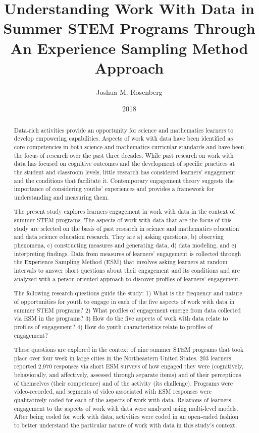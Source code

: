 \documentclass[]{msu-thesis}
\title{Understanding Work With Data in Summer STEM Programs Through An Experience Sampling Method Approach}
\author{Joshua M. Rosenberg}
\date{2018}
\theoremstyle{definition}
\theoremstyle{definition}
\theoremstyle{definition}
\theoremstyle{remark}
\begin{document}

\maketitlepage
\begin{abstract}

Data-rich activities provide an opportunity for science and mathematics learners to develop empowering capabilities. Aspects of work with data have been identified as core competencies in both science and mathematics curricular standards and have been the focus of research over the past three decades. While past research on work with data has focused on cognitive outcomes and the development of specific practices at the student and classroom levels, little research has considered learners’ engagement and the conditions that facilitate it. Contemporary engagement theory suggests the importance of considering youths' experiences and provides a framework for understanding and measuring them.

The present study explores learners engagement in work with data in the context of summer STEM programs. The aspects of work with data that are the focus of this study are selected on the basis of past research in science and mathematics education and data science education research. They are a) asking questions, b) observing phenomena, c) constructing measures and generating data, d) data modeling, and e) interpreting findings. Data from measures of learners' engagement is collected through the Experience Sampling Method (ESM) that involves asking learners at random intervals to answer short questions about their engagement and its conditions and are analyzed with a person-oriented approach to discover profiles of learners' engagement.

The following research questions guide the study: 1) What is the frequency and nature of opportunities for youth to engage in each of the five aspects of work with data in summer STEM programs? 2) What profiles of engagement emerge from data collected via ESM in the programs? 3) How do the five aspects of work with data relate to profiles of engagement? 4) How do youth characteristics relate to profiles of engagement?

These questions are explored in the context of nine summer STEM programs that took place over four week in large cities in the Northeastern United States. 203 learners reported 2,970 responses via short ESM surveys of how engaged they were (cognitively, behaviorally, and affectively, assessed through separate items) and of their perceptions of themselves (their competence) and of the activity (its challenge). Programs were video-recorded, and segments of video associated with ESM responses were qualitatively coded for each of the aspects of work with data. Relations of learners engagement to the aspects of work with data were analyzed using multi-level models. After being coded for work with data, activities were coded in an open-ended fashion to better understand the particular nature of work with data in this study's context.


\end{abstract}
\end{document}
